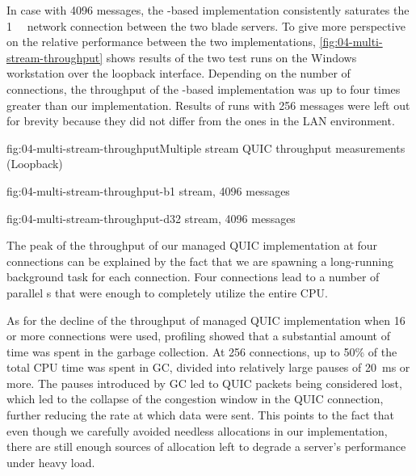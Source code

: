 In case with \SI{4096}{\byte} messages, the \libmsquic{}-based implementation consistently saturates
the \SI{1}{\giga\bit} network connection between the two blade servers. To give more perspective on
the relative performance between the two implementations, \autoref{fig:04-multi-stream-throughput}
shows results of the two test runs on the Windows workstation over the loopback interface. Depending
on the number of connections, the throughput of the \libmsquic{}-based implementation was up to four
times greater than our implementation. Results of runs with \SI{256}{\byte} messages were left out
for brevity because they did not differ from the ones in the LAN environment.

\begin{myFigure}{fig:04-multi-stream-throughput}{Multiple stream QUIC throughput measurements (Loopback)}
\begin{mySubfigure}{0.49\linewidth}{fig:04-multi-stream-throughput-b}{1 stream, \SI{4096}{\byte} messages}
\footnotesize

\end{mySubfigure}
\begin{mySubfigure}{0.49\linewidth}{fig:04-multi-stream-throughput-d}{32 stream, \SI{4096}{\byte} messages}
\footnotesize

\end{mySubfigure}
\end{myFigure}

The peak of the throughput of our managed QUIC implementation at four connections can be explained
by the fact that we are spawning a long-running background task for each connection. Four
connections lead to a number of parallel s that were enough to completely utilize the
entire CPU\@.

As for the decline of the throughput of managed QUIC implementation when 16 or more connections were
used, profiling showed that a substantial amount of time was spent in the garbage collection. At 256
connections, up to 50\% of the total CPU time was spent in GC, divided into relatively large pauses
of \SI{20}{\milli\second} or more. The pauses introduced by GC led to QUIC packets being considered
lost, which led to the collapse of the congestion window in the QUIC connection, further reducing
the rate at which data were sent. This points to the fact that even though we carefully avoided
needless allocations in our implementation, there are still enough sources of allocation left to
degrade a server's performance under heavy load.

